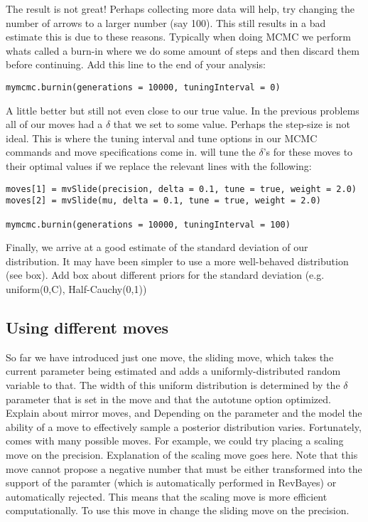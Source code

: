 The result is not great! Perhaps collecting more data will help, try changing the number of arrows to a larger number (say 100). This still results in a bad estimate this is due to these reasons. Typically when doing MCMC we perform whats called a burn-in where we do some amount of steps and then discard them before continuing. Add this line to the end of your analysis:

{\tt \begin{snugshade*}
 \begin{lstlisting}
mymcmc.burnin(generations = 10000, tuningInterval = 0)
 \end{lstlisting}
\end{snugshade*}}

A little better but still not even close to our true value. In the previous problems all of our moves had a $\delta$ that we set to some value. Perhaps the step-size is not ideal. This is where the tuning interval and tune options in our MCMC commands  and move specifications come in. \RevBayes will tune the $\delta$'s for these moves to their optimal values if we replace the relevant lines with the following:

{\tt \begin{snugshade*}
 \begin{lstlisting}
moves[1] = mvSlide(precision, delta = 0.1, tune = true, weight = 2.0)
moves[2] = mvSlide(mu, delta = 0.1, tune = true, weight = 2.0)
 
mymcmc.burnin(generations = 10000, tuningInterval = 100)
 \end{lstlisting}
\end{snugshade*}}

Finally, we arrive at a good estimate of the standard deviation of our distribution. It may have been simpler to use a more well-behaved distribution (see box). Add box about different priors for the standard deviation (e.g. uniform(0,C), Half-Cauchy(0,1))

\subsection{Using different moves}

So far we have introduced just one move, the sliding move, which takes the current parameter being estimated and adds a uniformly-distributed random variable to that. The width of this uniform distribution is determined by the $\delta$ parameter that is set in the move and that the autotune option optimized. Explain about mirror moves, and Depending on the parameter and the model the ability of a move to effectively sample a posterior distribution varies. Fortunately, \RevBayes comes with many possible moves. For example, we could try placing a scaling move on the precision. Explanation of the scaling move goes here. Note that this move cannot propose a negative number that must be either transformed into the support of the paramter (which is automatically performed in RevBayes) or automatically rejected. This means that the scaling move is more efficient computationally. To use this move in \RevBayes change the sliding move on the precision.

